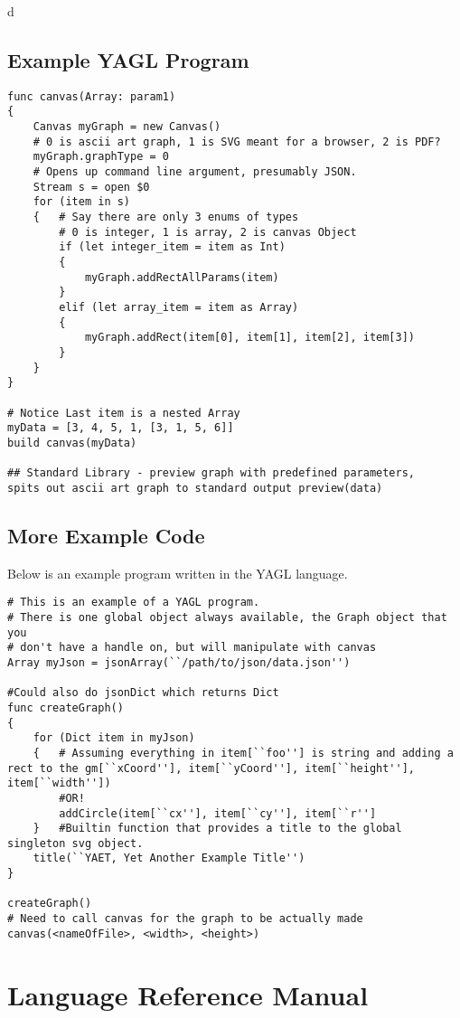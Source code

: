 \documentclass[12pt]{article}
\begin{document}
d
\subsection{Example YAGL Program}
\begin{lstlisting}
func canvas(Array: param1)
{
	Canvas myGraph = new Canvas()
	# 0 is ascii art graph, 1 is SVG meant for a browser, 2 is PDF?
	myGraph.graphType = 0
	# Opens up command line argument, presumably JSON.
	Stream s = open $0
	for (item in s)
	{	# Say there are only 3 enums of types
		# 0 is integer, 1 is array, 2 is canvas Object
		if (let integer_item = item as Int)
		{
			myGraph.addRectAllParams(item)
		}
		elif (let array_item = item as Array)
		{
			myGraph.addRect(item[0], item[1], item[2], item[3])
		}
	}
}

# Notice Last item is a nested Array 
myData = [3, 4, 5, 1, [3, 1, 5, 6]]
build canvas(myData)

## Standard Library - preview graph with predefined parameters, 
spits out ascii art graph to standard output preview(data)
\end{lstlisting}

\subsection{More Example Code}
Below is an example program written in the YAGL language.

\begin{lstlisting}
# This is an example of a YAGL program. 
# There is one global object always available, the Graph object that you 
# don't have a handle on, but will manipulate with canvas
Array myJson = jsonArray(``/path/to/json/data.json'')

#Could also do jsonDict which returns Dict 
func createGraph()
{
    for (Dict item in myJson)
    {   # Assuming everything in item[``foo''] is string and adding a rect to the gm[``xCoord''], item[``yCoord''], item[``height''], item[``width''])
        #OR!
        addCircle(item[``cx''], item[``cy''], item[``r'']
    }   #Builtin function that provides a title to the global singleton svg object. 
    title(``YAET, Yet Another Example Title'')
}

createGraph()
# Need to call canvas for the graph to be actually made
canvas(<nameOfFile>, <width>, <height>)

\end{lstlisting}

\section{Language Reference Manual}
\end{document}
